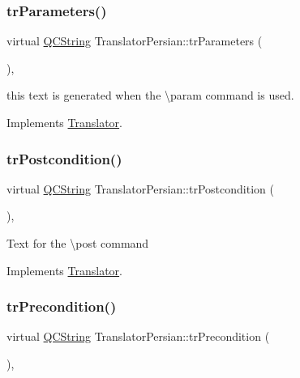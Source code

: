 \subsubsection{\texorpdfstring{trParameters()}{trParameters()}}
{\footnotesize\ttfamily virtual \mbox{\hyperlink{class_q_c_string}{Q\+C\+String}} Translator\+Persian\+::tr\+Parameters (\begin{DoxyParamCaption}{ }\end{DoxyParamCaption})\hspace{0.3cm}{\ttfamily [inline]}, {\ttfamily [virtual]}}

this text is generated when the \textbackslash{}param command is used. 

Implements \mbox{\hyperlink{class_translator}{Translator}}.

\mbox{\label{class_translator_persian_af3070534573f75203e392eeb738886e1}} 
\subsubsection{\texorpdfstring{trPostcondition()}{trPostcondition()}}
{\footnotesize\ttfamily virtual \mbox{\hyperlink{class_q_c_string}{Q\+C\+String}} Translator\+Persian\+::tr\+Postcondition (\begin{DoxyParamCaption}{ }\end{DoxyParamCaption})\hspace{0.3cm}{\ttfamily [inline]}, {\ttfamily [virtual]}}

Text for the \textbackslash{}post command 

Implements \mbox{\hyperlink{class_translator}{Translator}}.

\mbox{\label{class_translator_persian_a9b0460c74efe3db795c7f522c28c2764}} 
\subsubsection{\texorpdfstring{trPrecondition()}{trPrecondition()}}
{\footnotesize\ttfamily virtual \mbox{\hyperlink{class_q_c_string}{Q\+C\+String}} Translator\+Persian\+::tr\+Precondition (\begin{DoxyParamCaption}{ }\end{DoxyParamCaption})\hspace{0.3cm}{\ttfamily [inline]}, {\ttfamily [virtual]}}

